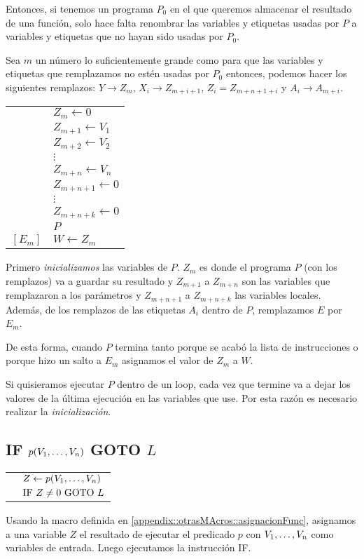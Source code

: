 Entonces, si tenemos un programa $P_0$ en el que queremos almacenar el resultado de una función, solo hace falta renombrar las variables y etiquetas usadas por $P$ a variables y etiquetas que no hayan sido usadas por $P_0$. 

Sea $m$ un número lo suficientemente grande como para que las variables y etiquetas que remplazamos no estén usadas por $P_0$ entonces, podemos hacer los siguientes remplazos: $Y \to Z_m$, $X_i \to Z_{m + i + 1}$, $Z_i = Z_{m + n + 1 + i}$ y $A_i \to A_{m + i}$.

\begin{multicols}{2}
\begin{center}
\begin{tabular}{ll}
	&$Z_m \leftarrow 0$ \\
	&$Z_{m+1} \leftarrow V_1$ \\
	&$Z_{m+2} \leftarrow V_2$ \\
	&$\vdots$ \\
	&$Z_{m+n} \leftarrow V_n$ \\
	&$Z_{m+n+1} \leftarrow 0$ \\
	&$\vdots$ \\
	&$Z_{m+n+k} \leftarrow 0$ \\
	&$P$ \\
	$[E_m]$ & $W\leftarrow Z_m$ \\ 
\end{tabular}
\end{center}

\columnbreak
Primero \textit{inicializamos} las variables de $P$. $Z_{m}$ es donde el programa $P$ (con los remplazos) va a guardar su resultado y $Z_{m+1}$ a $Z_{m+n}$ son las variables que remplazaron a los parámetros y $Z_{m+n+1}$ a $Z_{m+n+k}$ las variables locales. Además, de los remplazos de las etiquetas $A_i$ dentro de $P$, remplazamos $E$ por $E_m$.

De esta forma, cuando $P$ termina tanto porque se acabó la lista de instrucciones o porque hizo un salto a $E_m$ asignamos el valor de $Z_m$ a $W$.
\end{multicols}
Si quisieramos ejecutar $P$ dentro de un loop, cada vez que termine va a dejar los valores de la última ejecución en las variables que use. Por esta razón es necesario realizar la \textit{inicialización}.


\subsection{IF ${p(V_1,\dots, V_{n})}$ GOTO $L$}\label{appendix::otrasMAcros::ifPredicado}
\begin{multicols}{2}
\begin{tabular}{ll}
	& $Z \leftarrow p(V_1,\dots, V_{n})$ \\
	& $\text{IF }Z \neq 0 \text{ GOTO } L$
\end{tabular}

\columnbreak
Usando la macro definida en \ref{appendix::otrasMAcros::asignacionFunc}, asignamos a una variable $Z$ el resultado de ejecutar el predicado $p$ con $V_1,\dots, V_{n}$ como variables de entrada. Luego ejecutamos la instrucción IF.
\end{multicols}

